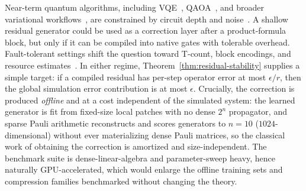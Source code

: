 \documentclass[aps,prresearch,reprint,superscriptaddress,nofootinbib,amsmath,amssymb]{revtex4-2}
\begin{document}
Near-term quantum algorithms, including VQE~\cite{peruzzo2014,mcclean2016}, QAOA~\cite{farhi2014,huynh2026gctr}, and broader variational workflows~\cite{cerezo2021,bharti2022,endo2021}, are constrained by circuit depth and noise~\cite{preskill2018,kandala2017,kim2023}. A shallow residual generator could be used as a correction layer after a product-formula block, but only if it can be compiled into native gates with tolerable overhead. Fault-tolerant settings shift the question toward T-count, block encodings, and resource estimates~\cite{wecker2014,wecker2015,babbush2018,babbush2019,haah2021}. In either regime, Theorem~\ref{thm:residual-stability} supplies a simple target: if a compiled residual has per-step operator error at most $\epsilon/r$, then the global simulation error contribution is at most $\epsilon$. Crucially, the correction is produced \emph{offline} and at a cost independent of the simulated system: the learned generator is fit from fixed-size local patches with no dense $2^n$ propagator, and sparse Pauli arithmetic reconstructs and scores generators to $n=10$ ($1024$-dimensional) without ever materializing dense Pauli matrices, so the classical work of obtaining the correction is amortized and size-independent. The benchmark suite is dense-linear-algebra and parameter-sweep heavy, hence naturally GPU-accelerated, which would enlarge the offline training sets and compression families benchmarked without changing the theory.
\end{document}
